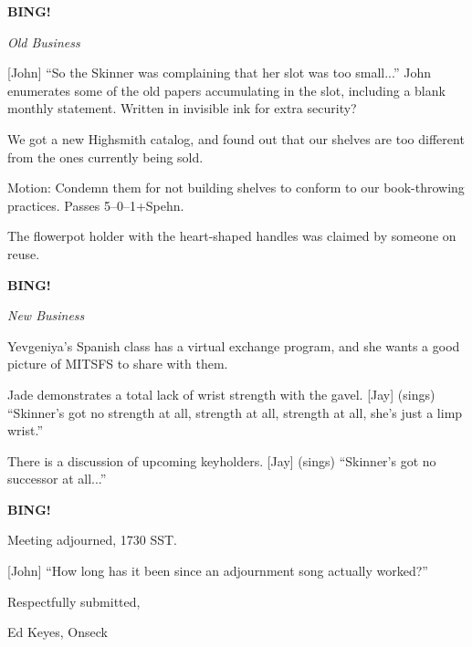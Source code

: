 \documentclass[12pt]{article}
\newcommand{\bing}{{\bf BING!} }
\newcommand{\goto}[1]{\bing \vskip 12pt \centerline{{\em{#1}}}}
\begin{document}
\goto{Old Business}

[John] ``So the Skinner was complaining that her slot was too small...''
John enumerates some of the old papers accumulating in the slot, including
a blank monthly statement.  Written in invisible ink for extra security?

We got a new Highsmith catalog, and found out that our shelves are too
different from the ones currently being sold.

Motion: Condemn them for not building shelves to conform to our
book-throwing practices.  Passes 5--0--1+Spehn.

The flowerpot holder with the heart-shaped handles was claimed by
someone on reuse.

\goto{New Business}

Yevgeniya's Spanish class has a virtual exchange program, and she wants
a good picture of MITSFS to share with them.

Jade demonstrates a total lack of wrist strength with the gavel.
[Jay] (sings) ``Skinner's got no strength at all, strength at all,
strength at all, she's just a limp wrist.''

There is a discussion of upcoming keyholders.  [Jay] (sings) ``Skinner's
got no successor at all...''

\bing

\vspace{12pt}

\noindent
Meeting adjourned, 1730 SST.

[John] ``How long has it been since an adjournment song actually worked?''

\vspace{18pt}

\centerline{Respectfully submitted,}
\centerline{Ed Keyes, Onseck}
\end{document}
